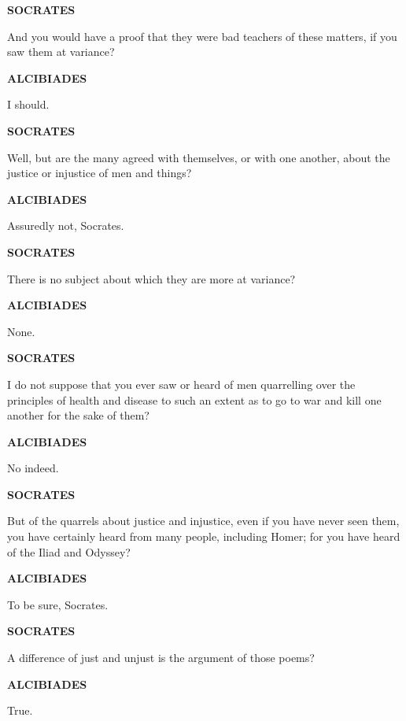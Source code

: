 \documentclass[11pt,letter]{article}
\begin{document}
\par \textbf{SOCRATES}
\par   And you would have a proof that they were bad teachers of these matters, if you saw them at variance?

\par \textbf{ALCIBIADES}
\par   I should.

\par \textbf{SOCRATES}
\par   Well, but are the many agreed with themselves, or with one another, about the justice or injustice of men and things?

\par \textbf{ALCIBIADES}
\par   Assuredly not, Socrates.

\par \textbf{SOCRATES}
\par   There is no subject about which they are more at variance?

\par \textbf{ALCIBIADES}
\par   None.

\par \textbf{SOCRATES}
\par   I do not suppose that you ever saw or heard of men quarrelling over the principles of health and disease to such an extent as to go to war and kill one another for the sake of them?

\par \textbf{ALCIBIADES}
\par   No indeed.

\par \textbf{SOCRATES}
\par   But of the quarrels about justice and injustice, even if you have never seen them, you have certainly heard from many people, including Homer; for you have heard of the Iliad and Odyssey?

\par \textbf{ALCIBIADES}
\par   To be sure, Socrates.

\par \textbf{SOCRATES}
\par   A difference of just and unjust is the argument of those poems?

\par \textbf{ALCIBIADES}
\par   True.
\end{document}
